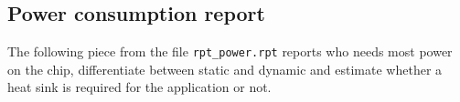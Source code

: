 \documentclass[12pt, a4paper]{article}
\begin{document}







\subsection{Power consumption report}

The following piece from the file \texttt{rpt\_power.rpt} reports who needs most power on the chip, differentiate between static and dynamic and estimate whether a heat sink is required for the application or not.
\end{document}

